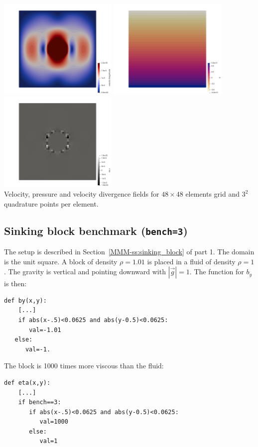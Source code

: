 \begin{center}
\includegraphics[width=5.7cm]{python_codes/fieldstone_18/results/sphere/NS/vel}
\includegraphics[width=5.7cm]{python_codes/fieldstone_18/results/sphere/NS/press}
\includegraphics[width=5.7cm]{python_codes/fieldstone_18/results/sphere/NS/divv}\\
{\captionfont Velocity, pressure and velocity divergence fields for $48\times 48$ 
elements grid and $3^2$ quadrature points per element.}
\end{center}




\newpage
\subsection*{Sinking block benchmark ({\tt bench=3})}

The setup is described in Section~\ref{MMM-ss:sinking_block} of part 1.
The domain is the unit square.
A block of density $\rho=1.01$ is placed in a fluid of density $\rho=1$.
The gravity is vertical and pointing downward with $|\vec{g}|=1$.
The function for $b_y$ is then:
\begin{lstlisting}
def by(x,y):
    [...]
    if abs(x-.5)<0.0625 and abs(y-0.5)<0.0625:
       val=-1.01
   else:
      val=-1.
\end{lstlisting}
The block is 1000 times more viscous than the fluid:
\begin{lstlisting}
def eta(x,y):
    [...]
    if bench==3:
       if abs(x-.5)<0.0625 and abs(y-0.5)<0.0625:
          val=1000
       else:
          val=1
\end{lstlisting}





